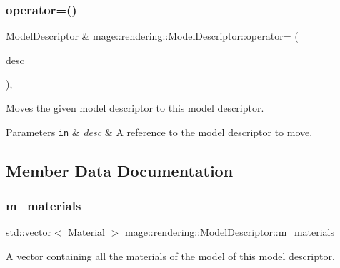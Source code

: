 \subsubsection{\texorpdfstring{operator=()}{operator=()}\hspace{0.1cm}{\footnotesize\ttfamily [2/2]}}
{\footnotesize\ttfamily \hyperlink{classmage_1_1rendering_1_1_model_descriptor}{Model\+Descriptor} \& mage\+::rendering\+::\+Model\+Descriptor\+::operator= (\begin{DoxyParamCaption}\item[{\hyperlink{classmage_1_1rendering_1_1_model_descriptor}{Model\+Descriptor} \&\&}]{desc }\end{DoxyParamCaption})\hspace{0.3cm}{\ttfamily [default]}, {\ttfamily [noexcept]}}

Moves the given model descriptor to this model descriptor.


\begin{DoxyParams}[1]{Parameters}
\mbox{\tt in}  & {\em desc} & A reference to the model descriptor to move. \\
\hline
\end{DoxyParams}


\subsection{Member Data Documentation}
\hypertarget{classmage_1_1rendering_1_1_model_descriptor_ae88269763478f47e5d6c0086a4aeb33b}{}\label{classmage_1_1rendering_1_1_model_descriptor_ae88269763478f47e5d6c0086a4aeb33b} 
\subsubsection{\texorpdfstring{m\+\_\+materials}{m\_materials}}
{\footnotesize\ttfamily std\+::vector$<$ \hyperlink{classmage_1_1rendering_1_1_material}{Material} $>$ mage\+::rendering\+::\+Model\+Descriptor\+::m\+\_\+materials\hspace{0.3cm}{\ttfamily [private]}}

A vector containing all the materials of the model of this model descriptor. \hypertarget{classmage_1_1rendering_1_1_model_descriptor_a18fd5970f038726fd200e60f3c5ad33e}{}\label{classmage_1_1rendering_1_1_model_descriptor_a18fd5970f038726fd200e60f3c5ad33e} 
